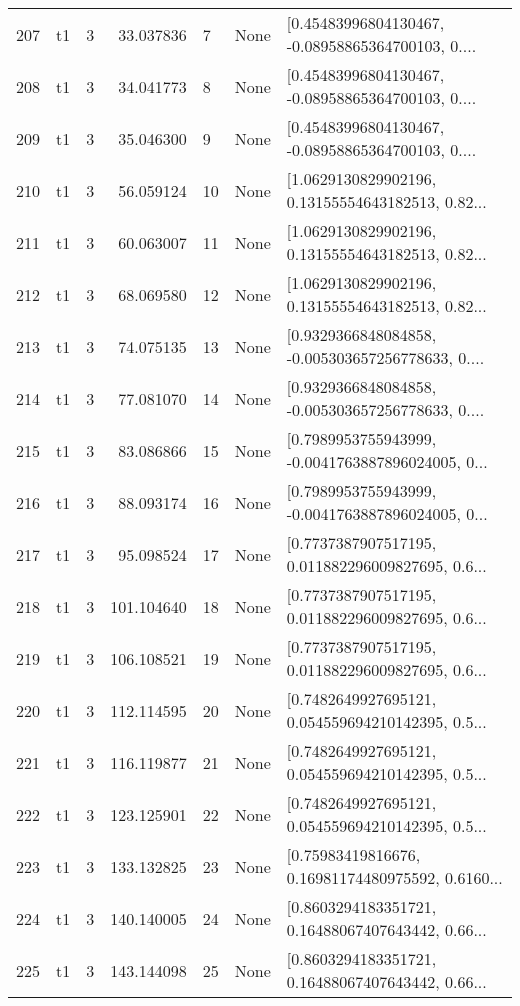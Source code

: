 \begin{tabular}{lllrlll}
207 &  t1 &   3 &   33.037836 &    7 &  None &  [0.45483996804130467, -0.08958865364700103, 0.... \\
208 &  t1 &   3 &   34.041773 &    8 &  None &  [0.45483996804130467, -0.08958865364700103, 0.... \\
209 &  t1 &   3 &   35.046300 &    9 &  None &  [0.45483996804130467, -0.08958865364700103, 0.... \\
210 &  t1 &   3 &   56.059124 &   10 &  None &  [1.0629130829902196, 0.13155554643182513, 0.82... \\
211 &  t1 &   3 &   60.063007 &   11 &  None &  [1.0629130829902196, 0.13155554643182513, 0.82... \\
212 &  t1 &   3 &   68.069580 &   12 &  None &  [1.0629130829902196, 0.13155554643182513, 0.82... \\
213 &  t1 &   3 &   74.075135 &   13 &  None &  [0.9329366848084858, -0.005303657256778633, 0.... \\
214 &  t1 &   3 &   77.081070 &   14 &  None &  [0.9329366848084858, -0.005303657256778633, 0.... \\
215 &  t1 &   3 &   83.086866 &   15 &  None &  [0.7989953755943999, -0.0041763887896024005, 0... \\
216 &  t1 &   3 &   88.093174 &   16 &  None &  [0.7989953755943999, -0.0041763887896024005, 0... \\
217 &  t1 &   3 &   95.098524 &   17 &  None &  [0.7737387907517195, 0.011882296009827695, 0.6... \\
218 &  t1 &   3 &  101.104640 &   18 &  None &  [0.7737387907517195, 0.011882296009827695, 0.6... \\
219 &  t1 &   3 &  106.108521 &   19 &  None &  [0.7737387907517195, 0.011882296009827695, 0.6... \\
220 &  t1 &   3 &  112.114595 &   20 &  None &  [0.7482649927695121, 0.054559694210142395, 0.5... \\
221 &  t1 &   3 &  116.119877 &   21 &  None &  [0.7482649927695121, 0.054559694210142395, 0.5... \\
222 &  t1 &   3 &  123.125901 &   22 &  None &  [0.7482649927695121, 0.054559694210142395, 0.5... \\
223 &  t1 &   3 &  133.132825 &   23 &  None &  [0.75983419816676, 0.16981174480975592, 0.6160... \\
224 &  t1 &   3 &  140.140005 &   24 &  None &  [0.8603294183351721, 0.16488067407643442, 0.66... \\
225 &  t1 &   3 &  143.144098 &   25 &  None &  [0.8603294183351721, 0.16488067407643442, 0.66... \\

\end{tabular}
